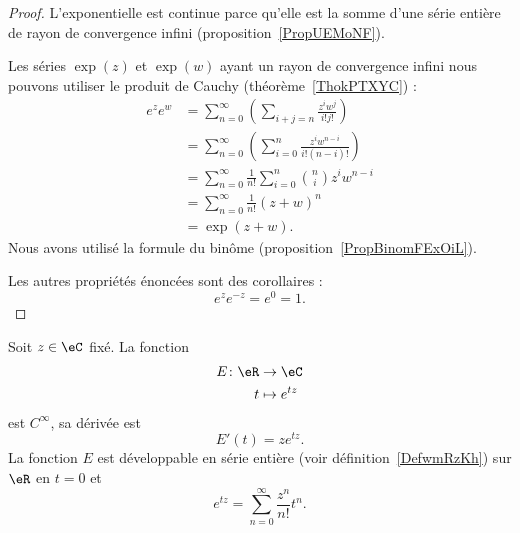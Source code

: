\begin{proof}
    L'exponentielle est continue parce qu'elle est la somme d'une série entière de rayon de convergence infini (proposition~\ref{PropUEMoNF}).

    Les séries \( \exp(z)\) et \( \exp(w)\) ayant un rayon de convergence infini nous pouvons utiliser le produit de Cauchy (théorème~\ref{ThokPTXYC}) :
    \begin{subequations}
        \begin{align}
            e^{z} e^{w}&=\sum_{n=0}^{\infty}\left( \sum_{i+j=n}\frac{ z^iw^j }{ i!j! } \right)\\
            &=\sum_{n=0}^{\infty}\left( \sum_{i=0}^n\frac{ z^iw^{n-i} }{ i!(n-i)! } \right)\\
            &=\sum_{n=0}^{\infty}\frac{1}{ n! }\sum_{i=0}^{n}{n\choose i}z^iw^{n-i}\\
            &=\sum_{n=0}^{\infty}\frac{1}{ n! }(z+w)^{n}\\
            &=\exp(z+w).
        \end{align}
    \end{subequations}
    Nous avons utilisé la formule du binôme (proposition~\ref{PropBinomFExOiL}).

    Les autres propriétés énoncées sont des corollaires :
    \begin{equation}
        e^{z} e^{-z}= e^{0}=1.
    \end{equation}
\end{proof}

\begin{proposition}
    Soit \( z\in\eC\) fixé. La fonction
    \begin{equation}
        \begin{aligned}
            E\colon \eR&\to \eC \\
            t&\mapsto  e^{tz}
        \end{aligned}
    \end{equation}
    est  \(  C^{\infty}\), sa dérivée est
    \begin{equation}
        E'(t)=z e^{tz}.
    \end{equation}
    La fonction \( E\) est développable en série entière (voir définition~\ref{DefwmRzKh}) sur \( \eR\) en \( t=0\) et
    \begin{equation}
        e^{tz}=\sum_{n=0}^{\infty}\frac{ z^n }{ n! }t^n.
    \end{equation}
\end{proposition}

